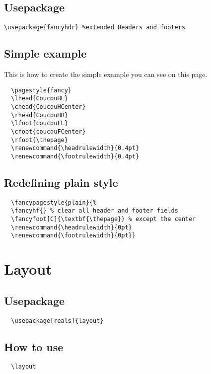 \documentclass[a4paper,12pt]{article}
\begin{document}
\subsection{Usepackage}
\begin{verbatim}
\usepackage{fancyhdr} %extended Headers and footers
\end{verbatim}

\subsection{Simple example}
This is how to create the simple example you can see on this page.
\begin{verbatim}
  \pagestyle{fancy}
  \lhead{CoucouHL}
  \chead{CoucouHCenter}
  \rhead{CoucouHR}
  \lfoot{coucouFL}
  \cfoot{coucouFCenter}
  \rfoot{\thepage}
  \renewcommand{\headrulewidth}{0.4pt}
  \renewcommand{\footrulewidth}{0.4pt}
\end{verbatim}

\pagestyle{fancy}
\rfoot{\thepage}
\renewcommand{\headrulewidth}{0.4pt}
\renewcommand{\footrulewidth}{0.4pt}


\subsection{Redefining plain style}
\begin{verbatim}
  \fancypagestyle{plain}{%
  \fancyhf{} % clear all header and footer fields
  \fancyfoot[C]{\textbf{\thepage}} % except the center
  \renewcommand{\headrulewidth}{0pt}
  \renewcommand{\footrulewidth}{0pt}}
\end{verbatim}



\newpage
\section{Layout}
\subsection{Usepackage}
\begin{verbatim}
  \usepackage[reals]{layout}
\end{verbatim}
\subsection{How to use}
\begin{verbatim}
  \layout
\end{verbatim}
\end{document}
